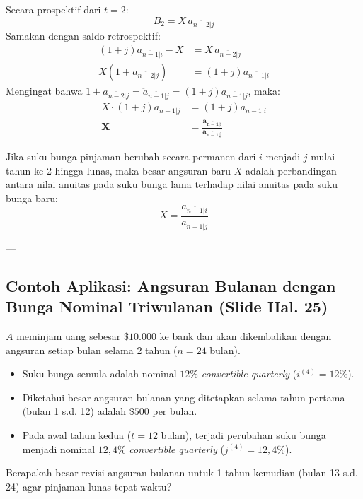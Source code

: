 \documentclass[11pt,a4paper]{article}
\begin{document}
Secara prospektif dari $t=2$:
\begin{equation}
    B_2 = X \, a_{\overline{n-2}|j}
\end{equation}
Samakan dengan saldo retrospektif:
\begin{align*}
    (1+j) a_{\overline{n-1}|i} - X &= X \, a_{\overline{n-2}|j} \\
    X \left( 1 + a_{\overline{n-2}|j} \right) &= (1+j) a_{\overline{n-1}|i}
\end{align*}
Mengingat bahwa $1 + a_{\overline{n-2}|j} = \ddot{a}_{\overline{n-1}|j} = (1+j) a_{\overline{n-1}|j}$, maka:
\begin{align*}
    X \cdot (1+j) a_{\overline{n-1}|j} &= (1+j) a_{\overline{n-1}|i} \\
    \mathbf{X} &= \mathbf{\frac{a_{\overline{n-1}|i}}{a_{\overline{n-1}|j}}}
\end{align*}

\begin{theorembox}
Jika suku bunga pinjaman berubah secara permanen dari $i$ menjadi $j$ mulai tahun ke-2 hingga lunas, maka besar angsuran baru $X$ adalah perbandingan antara nilai anuitas pada suku bunga lama terhadap nilai anuitas pada suku bunga baru:
\begin{equation*}
    X = \frac{a_{\overline{n-1}|i}}{a_{\overline{n-1}|j}}
\end{equation*}
\end{theorembox}

---

\subsection{Contoh Aplikasi: Angsuran Bulanan dengan Bunga Nominal Triwulanan (Slide Hal. 25)}

\begin{examplebox}
$A$ meminjam uang sebesar $\$10.000$ ke bank dan akan dikembalikan dengan angsuran setiap bulan selama 2 tahun ($n = 24$ bulan).
\begin{itemize}
    \item Suku bunga semula adalah nominal $12\%$ \textit{convertible quarterly} ($i^{(4)} = 12\%$).
    \item Diketahui besar angsuran bulanan yang ditetapkan selama tahun pertama (bulan 1 s.d. 12) adalah $\$500$ per bulan.
    \item Pada awal tahun kedua ($t = 12$ bulan), terjadi perubahan suku bunga menjadi nominal $12{,}4\%$ \textit{convertible quarterly} ($j^{(4)} = 12{,}4\%$).
\end{itemize}
Berapakah besar revisi angsuran bulanan untuk 1 tahun kemudian (bulan 13 s.d. 24) agar pinjaman lunas tepat waktu?
\end{examplebox}
\end{document}
